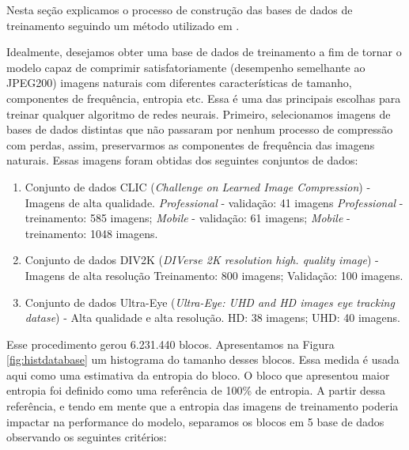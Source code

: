 Nesta seção explicamos o processo de construção das bases de dados de treinamento seguindo um método utilizado em \cite{DeliverableJuly}.


Idealmente, desejamos obter uma base de dados de treinamento a fim de tornar o modelo capaz de comprimir satisfatoriamente (desempenho semelhante ao JPEG200) imagens naturais com diferentes características de tamanho, componentes de frequência, entropia etc. Essa é uma das principais escolhas para treinar qualquer algoritmo de redes neurais.  
Primeiro, selecionamos imagens de bases de dados distintas que não passaram por nenhum processo de compressão com perdas, assim, preservarmos as componentes de frequência das imagens naturais. Essas imagens foram obtidas dos seguintes conjuntos de dados:

\begin{enumerate}
	\item Conjunto de dados CLIC \cite{bib:clic} (\textit{Challenge on Learned Image Compression}) - Imagens de alta qualidade.
	\subitem \textit{Professional} - validação: 41 imagens
	\subitem \textit{Professional} - treinamento: 585 imagens;
	\subitem \textit{Mobile} - validação: 61 imagens;
	\subitem \textit{Mobile} - treinamento: 1048 imagens.
	\item Conjunto de dados DIV2K \cite{bib:div2k} (\textit{DIVerse 2K resolution high.
		quality image}) - Imagens de alta resolução
	\subitem Treinamento: 800 imagens;
	\subitem Validação: 100 imagens.
	\item Conjunto de dados Ultra-Eye \cite{bib:ultraeye} (\textit{Ultra-Eye: UHD and HD images eye tracking datase}) - Alta qualidade e alta resolução.
	\subitem HD: 38 imagens;
	\subitem UHD: 40 imagens.
\end{enumerate}

Esse procedimento gerou 6.231.440 blocos. Apresentamos na Figura \ref{fig:histdatabase} um histograma do tamanho desses blocos. Essa medida é usada aqui como uma estimativa da entropia do bloco. 
O bloco que apresentou maior entropia foi definido como uma referência de 100\% de entropia. A partir dessa referência, e tendo em mente que a entropia das imagens de treinamento poderia impactar na performance do modelo, separamos os blocos em 5 base de dados observando os seguintes critérios:

